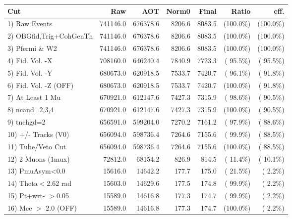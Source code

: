  \begin{table}[h!]\centering
 \begin{tabular}{||l||r|r|r|r|r|r||}
 \hline
 \hline
 Cut & Raw & AOT & Norm0 & Final & Ratio & eff.       \\
 \hline
  1) Raw Events           &     741146.0 &     676378.6 &       8206.6 &       8083.5 & (100.0\%) & (100.0\%) \\
  2) OBGfid,Trig+CohGenTh &     741146.0 &     676378.6 &       8206.6 &       8083.5 & (100.0\%) & (100.0\%) \\
  3) Pfermi \& W2         &     741146.0 &     676378.6 &       8206.6 &       8083.5 & (100.0\%) & (100.0\%) \\
  4) Fid. Vol. -X         &     708160.0 &     646240.4 &       7840.9 &       7723.3 & ( 95.5\%) & ( 95.5\%) \\
  5) Fid. Vol. -Y         &     680673.0 &     620918.5 &       7533.7 &       7420.7 & ( 96.1\%) & ( 91.8\%) \\
  6) Fid. Vol. -Z (OFF)   &     680673.0 &     620918.5 &       7533.7 &       7420.7 & (100.0\%) & ( 91.8\%) \\
  7) At Least 1 Mu        &     670921.0 &     612147.6 &       7427.3 &       7315.9 & ( 98.6\%) & ( 90.5\%) \\
  8) ncand=2,3,4          &     670921.0 &     612147.6 &       7427.3 &       7315.9 & (100.0\%) & ( 90.5\%) \\
  9) tnchgd=2             &     656591.0 &     599204.0 &       7270.2 &       7161.2 & ( 97.9\%) & ( 88.6\%) \\
 10) +/- Tracks (V0)      &     656094.0 &     598736.4 &       7264.6 &       7155.6 & ( 99.9\%) & ( 88.5\%) \\
 11) Tube/Veto Cut        &     656094.0 &     598736.4 &       7264.6 &       7155.6 & (100.0\%) & ( 88.5\%) \\
 12) 2 Muons (1mux)       &      72812.0 &      68154.2 &        826.9 &        814.5 & ( 11.4\%) & ( 10.1\%) \\
 13) PmuAsym<0.0          &      15616.0 &      14642.2 &        177.7 &        175.0 & ( 21.5\%) & (  2.2\%) \\
 14) Theta$<$2.62 rad     &      15603.0 &      14629.6 &        177.5 &        174.8 & ( 99.9\%) & (  2.2\%) \\
 15) Pt+wrt- $>$0.05      &      15589.0 &      14616.8 &        177.3 &        174.7 & ( 99.9\%) & (  2.2\%) \\
 16) Mee $>$ 2.0  (OFF)   &      15589.0 &      14616.8 &        177.3 &        174.7 & (100.0\%) & (  2.2\%) \\

\end{tabular}
\end{table}
